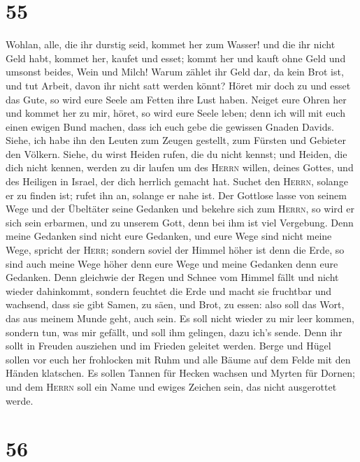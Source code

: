 \hypertarget{section-54}{%
\section{55}\label{section-54}}

 Wohlan, alle, die ihr durstig seid, kommet her zum
Wasser! und die ihr nicht Geld habt, kommet her, kaufet und esset; kommt
her und kauft ohne Geld und umsonst beides, Wein und Milch!
 Warum zählet ihr Geld dar, da kein Brot ist, und tut
Arbeit, davon ihr nicht satt werden könnt? Höret mir doch zu und esset
das Gute, so wird eure Seele am Fetten ihre Lust haben. 
Neiget eure Ohren her und kommet her zu mir, höret, so wird eure Seele
leben; denn ich will mit euch einen ewigen Bund machen, dass ich euch
gebe die gewissen Gnaden Davids.  Siehe, ich habe ihn den
Leuten zum Zeugen gestellt, zum Fürsten und Gebieter den Völkern.
 Siehe, du wirst Heiden rufen, die du nicht kennst; und
Heiden, die dich nicht kennen, werden zu dir laufen um des
\textsc{Herrn} willen, deines Gottes, und des Heiligen in Israel, der
dich herrlich gemacht hat.  Suchet den \textsc{Herrn},
solange er zu finden ist; rufet ihn an, solange er nahe ist.
 Der Gottlose lasse von seinem Wege und der Übeltäter
seine Gedanken und bekehre sich zum \textsc{Herrn}, so wird er sich sein
erbarmen, und zu unserem Gott, denn bei ihm ist viel Vergebung.
 Denn meine Gedanken sind nicht eure Gedanken, und eure
Wege sind nicht meine Wege, spricht der \textsc{Herr}; 
sondern soviel der Himmel höher ist denn die Erde, so sind auch meine
Wege höher denn eure Wege und meine Gedanken denn eure Gedanken.
 Denn gleichwie der Regen und Schnee vom Himmel fällt und
nicht wieder dahinkommt, sondern feuchtet die Erde und macht sie
fruchtbar und wachsend, dass sie gibt Samen, zu säen, und Brot, zu
essen:  also soll das Wort, das aus meinem Munde geht,
auch sein. Es soll nicht wieder zu mir leer kommen, sondern tun, was mir
gefällt, und soll ihm gelingen, dazu ich's sende.  Denn
ihr sollt in Freuden ausziehen und im Frieden geleitet werden. Berge und
Hügel sollen vor euch her frohlocken mit Ruhm und alle Bäume auf dem
Felde mit den Händen klatschen.  Es sollen Tannen für
Hecken wachsen und Myrten für Dornen; und dem \textsc{Herrn} soll ein
Name und ewiges Zeichen sein, das nicht ausgerottet werde.

\hypertarget{section-55}{%
\section{56}\label{section-55}}

